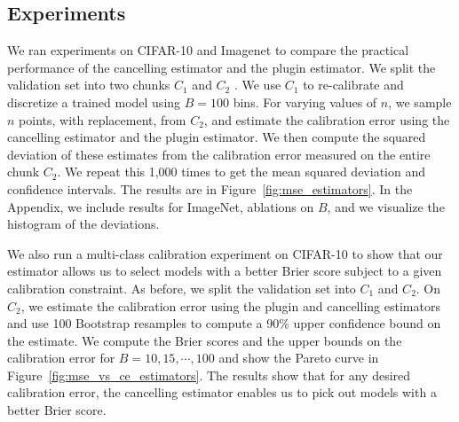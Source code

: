 \subsection{Experiments}

We ran experiments on CIFAR-10 and Imagenet to compare the practical performance of the cancelling estimator and the plugin estimator. We split the validation set  into two chunks $C_1$  and $C_2$ . We use $C_1$ to re-calibrate and discretize a trained model using $B = 100$ bins. For varying values of $n$, we sample $n$ points, with replacement, from $C_2$, and estimate the calibration error using the cancelling estimator and the plugin estimator. We then compute the squared deviation of these estimates from the calibration error measured on the entire chunk $C_2$. We repeat this 1,000 times to get the mean squared deviation and confidence intervals. The results are in Figure~\ref{fig:mse_estimators}. 
In the Appendix, we include results for ImageNet, ablations on $B$, and we visualize the histogram of the deviations.


We also run a multi-class calibration experiment on CIFAR-10 to show that our estimator allows us to select models with a better  Brier  score subject to a given calibration constraint. As before, we split the validation set into $C_1$ and $C_2$. On $C_2$, we estimate the calibration error using the plugin and cancelling estimators and use 100 Bootstrap resamples to compute a 90\% upper confidence bound on the estimate. We compute the Brier scores and the upper bounds on the calibration error for $B = 10, 15, \cdots, 100$ and show the Pareto curve in Figure~\ref{fig:mse_vs_ce_estimators}. The results show that for any desired calibration error, the cancelling estimator enables us to pick out models with a better Brier score.

